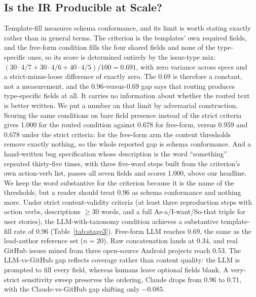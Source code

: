 \documentclass[preprint,12pt]{elsarticle}
\begin{document}
\subsection{Is the IR Producible at Scale?}\label{exp1-results}

Template-fill measures schema conformance, and its limit is worth stating exactly rather than
in general terms. The criterion is the templates' own required fields, and the free-form
condition fills the four shared fields and none of the type-specific ones, so its score is
determined entirely by the issue-type mix: $(30 \cdot 4/7 + 30 \cdot 4/6 + 40 \cdot 4/5)/100 =
0.691$, with zero variance across specs and a strict-minus-loose difference of exactly zero. The
0.69 is therefore a constant, not a measurement, and the 0.96-versus-0.69 gap says that routing
produces type-specific fields at all. It carries no information about whether the routed text is
better written. We put a number on that limit by adversarial construction. Scoring the same
conditions on bare field presence instead of the strict criteria gives 1.000 for the routed
condition against 0.678 for free-form, versus 0.959 and 0.678 under the strict criteria: for the
free-form arm the content thresholds remove exactly nothing, so the whole reported gap is schema
conformance. And a hand-written bug specification whose description is the word ``something''
repeated thirty-five times, with three five-word steps built from the criterion's own action-verb
list, passes all seven fields and scores 1.000, above our headline. We keep the word substantive
for the criterion because it is the name of the thresholds, but a reader should treat 0.96 as
schema conformance and nothing more. Under strict content-validity criteria (at
least three reproduction steps with action verbs, descriptions $\geq 30$ words, and a full
As-a/I-want/So-that triple for user stories), the LLM-with-taxonomy condition achieves a
substantive template-fill rate of 0.96 (Table~\ref{tab:stage3}). Free-form LLM reaches 0.69, the same as the lead-author reference set ($n=20$). Raw concatenation lands at 0.34, and real GitHub issues mined from three open-source Android projects reach 0.53. The LLM-vs-GitHub gap reflects coverage rather than content quality: the LLM is prompted to fill every field, whereas humans leave optional fields blank. A very-strict sensitivity sweep preserves the ordering, Claude drops from 0.96 to 0.71, with the Claude-vs-GitHub gap shifting only $-0.085$.
\end{document}
